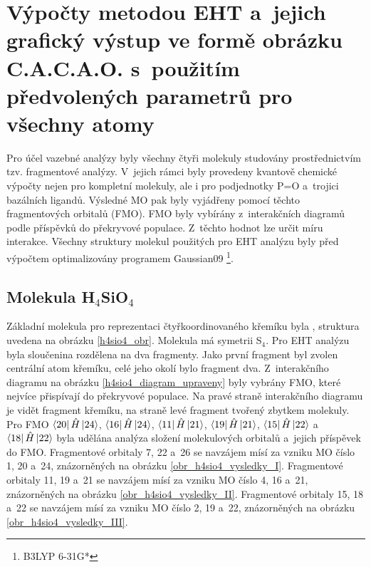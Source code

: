 \documentclass[
  printed, %
  table,   %
  lof,     %
  lot,     %
  oneside,
]{fithesis3}
\begin{document}
\section{Výpočty metodou EHT a~jejich grafický výstup ve formě obrázku C.A.C.A.O. s~použitím předvolených parametrů pro všechny atomy} \label{kapitola_EHT}
Pro účel vazebné analýzy byly všechny čtyři molekuly studovány prostřednictvím tzv. fragmentové analýzy. V~jejich rámci byly provedeny kvantově chemické výpočty nejen pro kompletní molekuly, ale i pro podjednotky P=O a~trojici bazálních ligandů. Výsledné MO pak byly vyjádřeny pomocí těchto fragmentových orbitalů (FMO). FMO byly vybírány z~interakčních diagramů podle příspěvků do překryvové populace. Z~těchto hodnot lze určit míru interakce. Všechny struktury molekul použitých pro EHT analýzu byly před výpočtem optimalizovány programem Gaussian09 \cite{g09} \footnote{B3LYP 6-31G*}.
\subsection{Molekula H$_4$SiO$_4$}
Základní molekula pro reprezentaci čtyřkoordinovaného křemíku byla , struktura uvedena na obrázku \ref{h4sio4_obr}. Molekula má symetrii S$_4$. Pro EHT analýzu byla sloučenina  rozdělena na dva fragmenty. Jako první fragment byl zvolen centrální atom křemíku, celé jeho okolí bylo fragment dva.   Z~interakčního diagramu na obrázku \ref{h4sio4_diagram_upraveny} byly vybrány FMO, které nejvíce přispívají do překryvové populace. Na pravé straně interakčního diagramu je vidět fragment křemíku, na straně levé fragment tvořený zbytkem molekuly. Pro FMO $\bra{20}{\hat{H}}\ket{24}$, $\bra{16}{\hat{H}}\ket{24}$, $\bra{11}{\hat{H}}\ket{21}$, $\bra{19}{\hat{H}}\ket{21}$, $\bra{15}{\hat{H}}\ket{22}$ a~$\bra{18}{\hat{H}}\ket{22}$ byla udělána analýza složení molekulových orbitalů a~jejich příspěvek do FMO.  Fragmentové orbitaly 7, 22 a~26 se navzájem mísí za vzniku MO číslo 1, 20 a~24, znázorněných na obrázku \ref{obr_h4sio4_vysledky_I}. Fragmentové orbitaly  11, 19 a~21 se navzájem mísí za vzniku MO číslo 4, 16 a~21, znázorněných na obrázku \ref{obr_h4sio4_vysledky_II}. Fragmentové orbitaly  15, 18 a~22 se navzájem mísí za vzniku MO číslo 2, 19 a~22, znázorněných na obrázku \ref{obr_h4sio4_vysledky_III}.    
\end{document}
